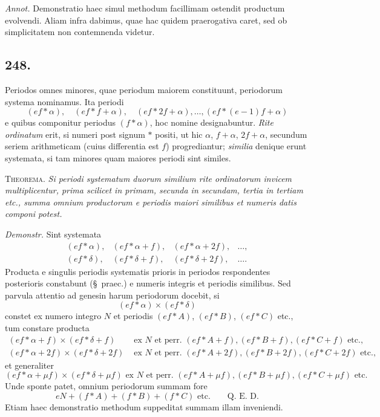 \documentclass[12pt]{article}
\begin{document}
\textit{Annot.} Demonstratio haec simul methodum facillimam ostendit productum evolvendi. Aliam infra dabimus, quae hac quidem praerogativa caret, sed ob simplicitatem non contemnenda videtur.

\subsection*{248.}
Periodos omnes minores, quae periodum maiorem constituunt, periodorum systema nominamus. Ita periodi
\[
(ef*\alpha),\quad (ef*f+\alpha),\quad (ef*2f+\alpha),\ldots,(ef*(e-1)f+\alpha)
\]
e quibus componitur periodus $(f*\alpha)$, hoc nomine designabuntur. \textit{Rite ordinatum} erit, si numeri post signum $*$ positi, ut hic $\alpha$, $f+\alpha$, $2f+\alpha$, secundum seriem arithmeticam (cuius differentia est $f$) progrediantur; \textit{similia} denique erunt systemata, si tam minores quam maiores periodi sint similes.

\textsc{Theorema.} \textit{Si periodi systematum duorum similium rite ordinatorum invicem multiplicentur, prima scilicet in primam, secunda in secundam, tertia in tertiam etc., summa omnium productorum e periodis maiori similibus et numeris datis componi potest.}

\textit{Demonstr.} Sint systemata
\[
\begin{array}{cccc}
(ef*\alpha),&(ef*\alpha+f),&(ef*\alpha+2f),&\ldots,\\
(ef*\delta),&(ef*\delta+f),&(ef*\delta+2f),&\ldots.
\end{array}
\]
Producta e singulis periodis systematis prioris in periodos respondentes posterioris constabunt (\S~praec.) e numeris integris et periodis similibus. Sed parvula attentio ad genesin harum periodorum docebit, si
\[
(ef*\alpha)\times(ef*\delta)
\]
constet ex numero integro $N$ et periodis $(ef*A)$, $(ef*B)$, $(ef*C)$ etc., tum constare producta
\[
\begin{aligned}
(ef*\alpha+f)\times(ef*\delta+f)&\text{ ex }N\text{ et perr. }(ef*A+f),(ef*B+f),(ef*C+f)\text{ etc.},\\
(ef*\alpha+2f)\times(ef*\delta+2f)&\text{ ex }N\text{ et perr. }(ef*A+2f),(ef*B+2f),(ef*C+2f)\text{ etc.},
\end{aligned}
\]
et generaliter
\[
(ef*\alpha+\mu f)\times(ef*\delta+\mu f)\text{ ex }N\text{ et perr. }(ef*A+\mu f),(ef*B+\mu f),(ef*C+\mu f)\text{ etc.}
\]
Unde sponte patet, omnium periodorum summam fore
\[
eN+(f*A)+(f*B)+(f*C)\text{ etc.}\qquad\text{Q. E. D.}
\]
Etiam haec demonstratio methodum suppeditat summam illam inveniendi.
\end{document}
